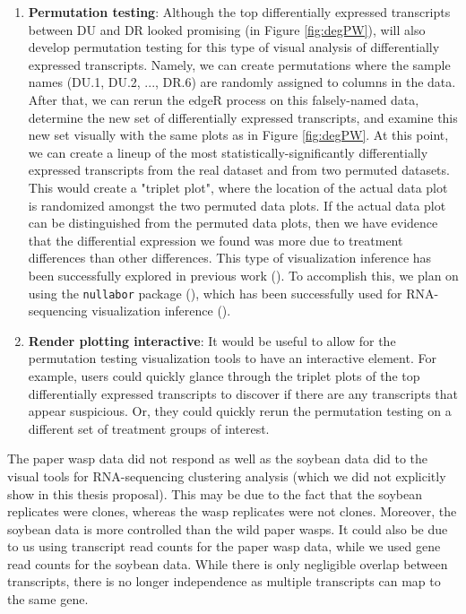 \documentclass[11pt,a4paper,oldfontcommands,openany]{memoir}
\numberwithin{equation}{section} %
\newcommand{\pkg}[1]{{\texttt{#1}}}
\begin{document}
\begin{enumerate}
\item \textbf{Permutation testing}: Although the top differentially expressed transcripts between DU and DR looked promising (in Figure \ref{fig:degPW}), will also develop permutation testing for this type of visual analysis of differentially expressed transcripts. Namely, we can create permutations where the sample names (DU.1, DU.2, ..., DR.6) are randomly assigned to columns in the data. After that, we can rerun the edgeR process on this falsely-named data, determine the new set of differentially expressed transcripts, and examine this new set visually with the same plots as in Figure \ref{fig:degPW}. At this point, we can create a lineup of the most statistically-significantly differentially expressed transcripts from the real dataset and from two permuted datasets. This would create a "triplet plot", where the location of the actual data plot is randomized amongst the two permuted data plots. If the actual data plot can be distinguished from the permuted data plots, then we have evidence that the differential expression we found was more due to treatment differences than other differences. This type of visualization inference has been successfully explored in previous work (\citealt{extra6}). To accomplish this, we plan on using the \pkg{nullabor} package (\citealt{nullabor}), which has been successfully used for RNA-sequencing visualization inference (\citealt{extra1}).

\item \textbf{Render plotting interactive}: It would be useful to allow for the permutation testing visualization tools to have an interactive element. For example, users could quickly glance through the triplet plots of the top differentially expressed transcripts to discover if there are any transcripts that appear suspicious. Or, they could quickly rerun the permutation testing on a different set of treatment groups of interest.

\end{enumerate}

The paper wasp data did not respond as well as the soybean data did to the visual tools for RNA-sequencing clustering analysis (which we did not explicitly show in this thesis proposal). This may be due to the fact that the soybean replicates were clones, whereas the wasp replicates were not clones. Moreover, the soybean data is more controlled than the wild paper wasps. It could also be due to us using transcript read counts for the paper wasp data, while we used gene read counts for the soybean data. While there is only negligible overlap between transcripts, there is no longer independence as multiple transcripts can map to the same gene.
\end{document}
